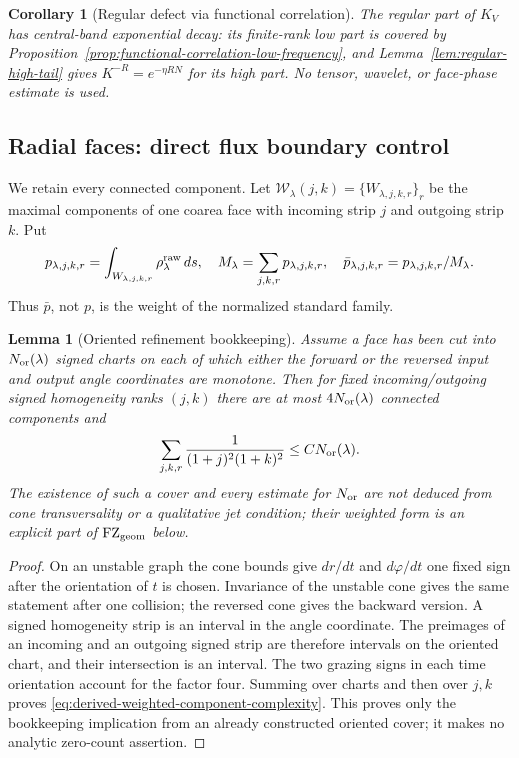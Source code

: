 \documentclass[11pt]{article}
\newtheorem{lemma}[theorem]{Lemma}
\newtheorem{corollary}[theorem]{Corollary}
\begin{document}
\begin{corollary}[Regular defect via functional correlation]
\label{cor:regular-functional-correlation}
The regular part of $K_V$ has central-band exponential decay: its finite-rank
low part is covered by Proposition~\ref{prop:functional-correlation-low-frequency}, and
Lemma~\ref{lem:regular-high-tail} gives $K^{-R}=e^{-\eta RN}$ for its high
part.  No tensor, wavelet, or face-phase estimate is used.
\end{corollary}

\subsection{Radial faces: direct flux boundary control}

We retain every connected component.  Let
$\mathcal W_\lambda(j,k)=\{W_{\lambda,j,k,r}\}_r$ be the maximal components
of one coarea face with incoming strip $j$ and outgoing strip $k$.  Put
\[
 p_{\lambda,j,k,r}=\int_{W_{\lambda,j,k,r}}\rho^{\rm raw}_\lambda\,ds,
 \quad M_\lambda=\sum_{j,k,r}p_{\lambda,j,k,r},\quad
 \bar p_{\lambda,j,k,r}=p_{\lambda,j,k,r}/M_\lambda.
\]
Thus $\bar p$, not $p$, is the weight of the normalized standard family.

\begin{lemma}[Oriented refinement bookkeeping]
\label{lem:cone-monotone-components}
Assume a face has been cut into $N_{\rm or}(\lambda)$ signed charts on each
of which either the forward or the reversed input and output angle
coordinates are monotone.  Then for fixed incoming/outgoing signed
homogeneity ranks $(j,k)$ there are at most $4N_{\rm or}(\lambda)$ connected
components and
\begin{equation}
\label{eq:derived-weighted-component-complexity}
 \sum_{j,k,r}\frac1{(1+j)^2(1+k)^2}
 \le C N_{\rm or}(\lambda).
\end{equation}
The existence of such a cover and every estimate for $N_{\rm or}$ are not
deduced from cone transversality or a qualitative jet condition; their
weighted form is an explicit part of $\mathrm{FZ}_{\rm geom}$ below.
\end{lemma}

\begin{proof}
On an unstable graph the cone bounds give $dr/dt$ and $d\varphi/dt$ one fixed
sign after the orientation of $t$ is chosen.  Invariance of the unstable cone
gives the same statement after one collision; the reversed cone gives the
backward version.  A signed homogeneity strip is an interval in the angle
coordinate.  The preimages of an incoming and an outgoing signed strip are
therefore intervals on the oriented chart, and their intersection is an
interval.  The two grazing signs in each time orientation account for the
factor four.  Summing over charts and then over $j,k$ proves
\eqref{eq:derived-weighted-component-complexity}.  This proves only the
bookkeeping implication from an already constructed oriented cover; it makes
no analytic zero-count assertion.
\end{proof}
\end{document}
